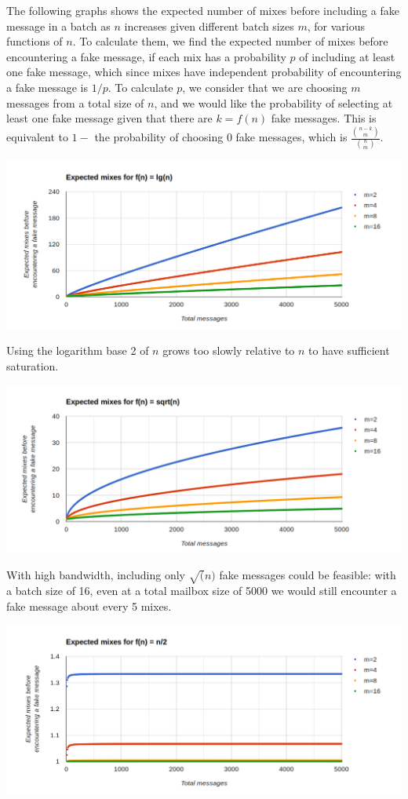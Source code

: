 \documentclass[pageno]{jpaper}
\begin{document}
The following graphs shows the expected number of mixes before including a fake message in a batch as $n$ increases given different batch sizes $m$, for various functions of $n$. To calculate them, we find the expected number of mixes before encountering a fake message, if each mix has a probability $p$ of including at least one fake message, which since mixes have independent probability of encountering a fake message is $1/p$. To calculate $p$, we consider that we are choosing $m$ messages from a total size of $n$, and we would like the probability of selecting at least one fake message given that there are $k=f(n)$ fake messages. This is equivalent to $1-$ the probability of choosing 0 fake messages, which is $\frac{{{n-k}\choose m}}{{n \choose m}}$.

\includegraphics[width=\textwidth]{lgn}

Using the logarithm base 2 of $n$ grows too slowly relative to $n$ to have sufficient saturation.

\includegraphics[width=\textwidth]{sqrtn}

With high bandwidth, including only $\sqrt(n)$ fake messages could be feasible: with a batch size of 16, even at a total mailbox size of 5000 we would still encounter a fake message about every 5 mixes.


\includegraphics[width=\textwidth]{nover2}
\end{document}
